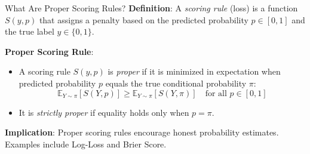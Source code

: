 \documentclass[11pt,compress,t,notes=noshow, aspectratio=169, xcolor=table]{beamer}
\begin{document}
\newcommand{\titlefigure}{figure/calibrationplot}
\newcommand{\learninggoals}{
\item Understand difference between calibration and discrimination
\item How to diagnose calibration
\item How to calibrate probabilities}



\begin{frame}{What Are Proper Scoring Rules?}
\textbf{Definition}: A \emph{scoring rule} (loss) is a function $S(y, p)$ that assigns a penalty based on the predicted probability $p \in [0,1]$ and the true label $y \in \{0,1\}$.

\medskip
\textbf{Proper Scoring Rule}:
\begin{itemize}
    \item A scoring rule $S(y, p)$ is \emph{proper} if it is minimized in expectation when predicted probability $p$ equals the true conditional probability $\pi$:
    \[
    \mathbb{E}_{Y \sim \pi}[S(Y, p)] \geq \mathbb{E}_{Y \sim \pi}[S(Y, \pi)]
    \quad \text{for all } p \in [0,1]
    \]
    \item It is \emph{strictly proper} if equality holds only when $p = \pi$.
\end{itemize}

\medskip
\textbf{Implication}: Proper scoring rules encourage honest probability estimates. Examples include Log-Loss and Brier Score.
\end{frame}








\end{document}
